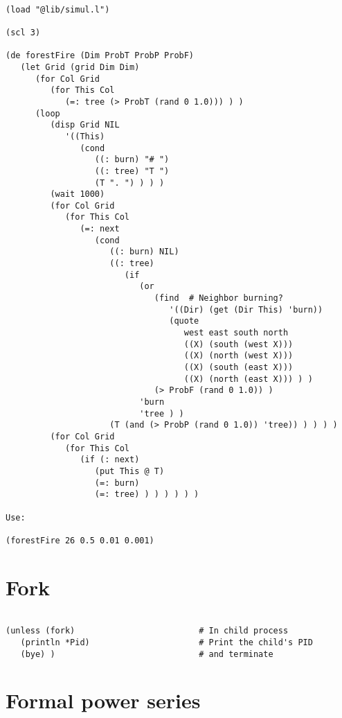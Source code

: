 \begin{verbatim}

(load "@lib/simul.l")

(scl 3)

(de forestFire (Dim ProbT ProbP ProbF)
   (let Grid (grid Dim Dim)
      (for Col Grid
         (for This Col
            (=: tree (> ProbT (rand 0 1.0))) ) )
      (loop
         (disp Grid NIL
            '((This)
               (cond
                  ((: burn) "# ")
                  ((: tree) "T ")
                  (T ". ") ) ) )
         (wait 1000)
         (for Col Grid
            (for This Col
               (=: next
                  (cond
                     ((: burn) NIL)
                     ((: tree)
                        (if
                           (or
                              (find  # Neighbor burning?
                                 '((Dir) (get (Dir This) 'burn))
                                 (quote
                                    west east south north
                                    ((X) (south (west X)))
                                    ((X) (north (west X)))
                                    ((X) (south (east X)))
                                    ((X) (north (east X))) ) )
                              (> ProbF (rand 0 1.0)) )
                           'burn
                           'tree ) )
                     (T (and (> ProbP (rand 0 1.0)) 'tree)) ) ) ) )
         (for Col Grid
            (for This Col
               (if (: next)
                  (put This @ T)
                  (=: burn)
                  (=: tree) ) ) ) ) ) )

Use:

(forestFire 26 0.5 0.01 0.001)

\end{verbatim}

\section*{Fork}

\begin{verbatim}

(unless (fork)                         # In child process
   (println *Pid)                      # Print the child's PID
   (bye) )                             # and terminate

\end{verbatim}

\section*{Formal power series}

